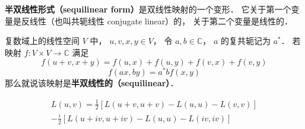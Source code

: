 
\begin{issues}
\issueDraft
\end{issues}

\textbf{半双线性形式（sequilinear form）}是双线性映射的一个变形． 它关于第一个变量是反线性（也叫共轭线性 conjugate linear）的， 关于第二个变量是线性的．
\begin{definition}{}
复数域上的线性空间 $V$ 中， $u, v, x, y\in V$， 令 $a,b\in \mathbb C$， $a$ 的复共轭记为 $a^*$． 若映射 $f:V\times V\to \mathbb C$ 满足
\begin{equation}
f(u+v, x+y) = f(u,x) + f(u,y) + f(v,x) + f(v,y)
\end{equation}
\begin{equation}\label{sequil_eq1}
f(ax, by) = a^* b f(x, y)
\end{equation}
那么就说该映射是\textbf{半双线性的（sequilinear）}．
\end{definition}

\begin{equation}
\begin{aligned}
L(u, v) =\frac{1}{2}[L(u+v, u+v)-L(u, u)-L(v, v)]\\
-\frac{i}{2}[L(u+i v, u+i v)-L(u, u)-L(i v, i v)]
\end{aligned}
\end{equation}
